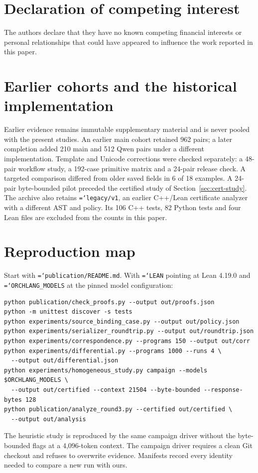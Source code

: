 \documentclass[preprint,12pt]{elsarticle}
\theoremstyle{definition}
\newcommand{\code}[1]{\texttt{\hyphenchar\font=`\-#1}}
\begin{document}
\section*{Declaration of competing interest}
The authors declare that they have no known competing financial interests or
personal relationships that could have appeared to influence the work reported in
this paper.

\begingroup\small

\endgroup
\appendix
\section{Earlier cohorts and the historical implementation}

Earlier evidence remains immutable supplementary material and is never pooled
with the present studies. An earlier main cohort retained 962 pairs; a later
completion added 210 main and 512 Qwen pairs under a different implementation.
Template and Unicode corrections were checked separately: a 48-pair workflow
study, a 192-case primitive matrix and a 24-pair release check. A targeted
comparison differed from older saved fields in 6 of 18 examples. A 24-pair
byte-bounded pilot preceded the certified study of Section~\ref{sec:cert-study}.
The archive also retains \code{legacy/v1}, an earlier C++/Lean certificate analyzer
with a different AST and policy. Its 106 C++ tests, 82 Python tests and four Lean
files are excluded from the counts in this paper.

\section{Reproduction map}\label{app:repro}
Start with \code{publication/README.md}. With \code{LEAN} pointing at Lean 4.19.0 and
\code{ORCHLANG\_MODELS} at the pinned model configuration:
\begingroup
\lstset{basicstyle=\ttfamily\footnotesize}
\begin{lstlisting}
python publication/check_proofs.py --output out/proofs.json
python -m unittest discover -s tests
python experiments/source_binding_case.py --output out/policy.json
python experiments/serializer_roundtrip.py --output out/roundtrip.json
python experiments/correspondence.py --programs 150 --output out/corr
python experiments/differential.py --programs 1000 --runs 4 \
  --output out/differential.json
python experiments/homogeneous_study.py campaign --models $ORCHLANG_MODELS \
  --output out/certified --context 21504 --byte-bounded --response-bytes 128
python publication/analyze_round3.py --certified out/certified \
  --output out/analysis
\end{lstlisting}
\endgroup
The heuristic study is reproduced by the same campaign driver without the
byte-bounded flags at a 4,096-token context. The campaign driver requires a clean
Git checkout and refuses to overwrite evidence. Manifests record every identity
needed to compare a new run with ours.
\end{document}
